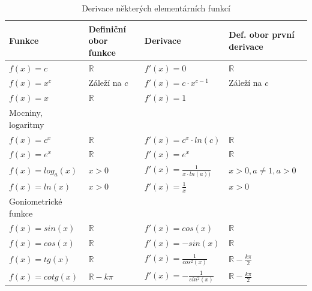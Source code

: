 \documentclass[10pt,a4paper]{article}
\begin{document}
\renewcommand{\arraystretch}{1.2} 
\begin{table}[ht]
\centering
\begin{tabular}{llll}
\hline
Funkce              & Definiční obor funkce & Derivace                          & Def. obor první derivace       \\
\hline
$\displaystyle f(x) = c$          & $\mathbb{R}$          				& $\displaystyle f'(x) = 0$                       & $\displaystyle \mathbb{R}$                   \\
$\displaystyle f(x) = x^c$        & Záleží na $c$         				& $\displaystyle f'(x) = c \cdot x^{c-1}$         & Záleží na $c$                  \\
$\displaystyle f(x) = x$          & $\mathbb{R}$          				& $\displaystyle f'(x) = 1$                       &                                \\
\hline
Mocniny, logaritmy  &                       &                                   &                                \\
\hline
$\displaystyle f(x) =c^x $        & $\displaystyle \mathbb{R}$          & $\displaystyle f'(x) = c^x \cdot ln(c)$         & $\displaystyle \mathbb{R}$                   \\
$\displaystyle f(x) = e^x$        & $\displaystyle \mathbb{R}$          & $\displaystyle f'(x) = e^x$                     & $\displaystyle \mathbb{R}$                   \\
$\displaystyle f(x) = log_a(x)$   & $\displaystyle x>0$                 & $\displaystyle f'(x) = \frac{1}{x\cdot ln(a))}$ & $\displaystyle x > 0, a \neq 1, a>0$         \\
$\displaystyle f(x) =ln(x) $      & $\displaystyle x>0$                 & $\displaystyle f'(x) = \frac{1}{x}$             & $\displaystyle x > 0$                        \\
\hline
Goniometrické funkce &                       &                                   &                                \\
\hline
$\displaystyle f(x) = sin(x)$     & $\displaystyle \mathbb{R}$          & $\displaystyle f'(x) = cos(x)$                  & $\displaystyle \mathbb{R}$                   \\
$\displaystyle f(x) = cos(x)$     & $\displaystyle \mathbb{R}$          & $\displaystyle f'(x) = -sin(x)$                 & $\displaystyle \mathbb{R}$                   \\
$\displaystyle f(x) = tg(x)$      & $\displaystyle \mathbb{R}$          & $\displaystyle f'(x) = \frac{1}{cos^2(x)}$      & $\displaystyle \mathbb{R} - \frac{k \pi}{2}$ \\
$\displaystyle f(x) = cotg(x)$    & $\displaystyle \mathbb{R} - k \pi$  & $\displaystyle f'(x) = - \frac{1}{sin^2(x)}$    & $\displaystyle \mathbb{R} - \frac{k \pi}{2}$ \\
\hline
\end{tabular}
\caption{Derivace některých elementárních funkcí}
\label{tab:elementarniDerivace}
\end{table}
\renewcommand{\arraystretch}{1} 
\end{document}
